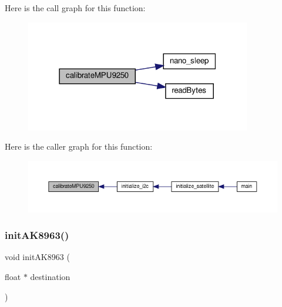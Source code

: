 Here is the call graph for this function\+:
\nopagebreak
\begin{figure}[H]
\begin{center}
\leavevmode
\includegraphics[width=279pt]{i2c-interface_8c_a52b2e791d39612643014e3900f1bc7d2_cgraph}
\end{center}
\end{figure}
Here is the caller graph for this function\+:
\nopagebreak
\begin{figure}[H]
\begin{center}
\leavevmode
\includegraphics[width=350pt]{i2c-interface_8c_a52b2e791d39612643014e3900f1bc7d2_icgraph}
\end{center}
\end{figure}
\mbox{\label{i2c-interface_8c_a70fbb9dd53a39541d7f04140a2c63f3f}} 
\subsubsection{\texorpdfstring{init\+A\+K8963()}{initAK8963()}}
{\footnotesize\ttfamily void init\+A\+K8963 (\begin{DoxyParamCaption}\item[{float $\ast$}]{destination }\end{DoxyParamCaption})}

